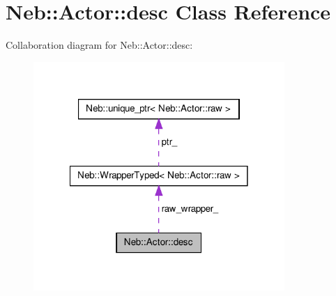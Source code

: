 \hypertarget{classNeb_1_1Actor_1_1desc}{\section{\-Neb\-:\-:\-Actor\-:\-:desc \-Class \-Reference}
\label{classNeb_1_1Actor_1_1desc}
}


\-Collaboration diagram for \-Neb\-:\-:\-Actor\-:\-:desc\-:\nopagebreak
\begin{figure}[H]
\begin{center}
\leavevmode
\includegraphics[width=270pt]{classNeb_1_1Actor_1_1desc__coll__graph}
\end{center}
\end{figure}
